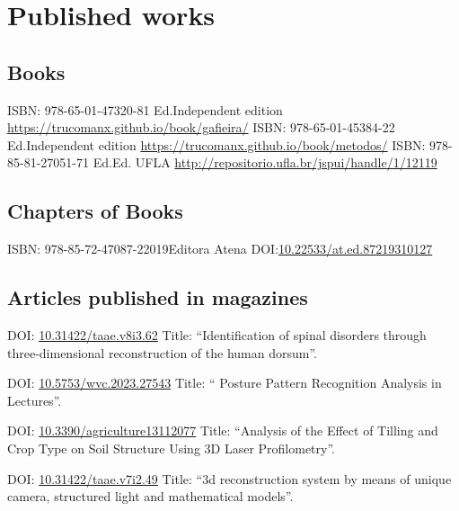 \documentclass[11pt,a4paper,sans]{moderncv} %
\newcommand{\doiurl}[1]{\href{https://doi.org/#1}{#1}}
\begin{document}
\section{Published works}
\subsection{Books}
	      {ISBN: 978-65-01-47320-8}{1 Ed.}{Independent edition}
	      {\url{https://trucomanx.github.io/book/gafieira/}}
	      {ISBN: 978-65-01-45384-2}{2 Ed.}{Independent edition}
	      {\url{https://trucomanx.github.io/book/metodos/}}
	      {ISBN: 978-85-81-27051-7}{1 Ed.}{Ed. UFLA}
	      {\url{http://repositorio.ufla.br/jspui/handle/1/12119}}

\subsection{Chapters of Books}
	      {ISBN: 978-85-72-47087-2}{2019}{Editora Atena}
	      {DOI:\doiurl{10.22533/at.ed.87219310127}}

\subsection{Articles published in magazines}

	      {DOI: \doiurl{10.31422/taae.v8i3.62} }{}{}
	      {Title: ``Identification of spinal disorders through three-dimensional reconstruction of the human dorsum''.}
	      
	      {DOI: \doiurl{10.5753/wvc.2023.27543} }{}{}
	      {Title: `` Posture Pattern Recognition Analysis in Lectures''.}
	      
	      {DOI: \doiurl{10.3390/agriculture13112077} }{}{}
	      {Title: ``Analysis of the Effect of Tilling and Crop Type on Soil Structure Using 3D Laser Profilometry''.}
	      
	      {DOI: \doiurl{10.31422/taae.v7i2.49} }{}{}
	      {Title: ``3d reconstruction system by means of unique camera, structured light and mathematical models''.}
\end{document}
